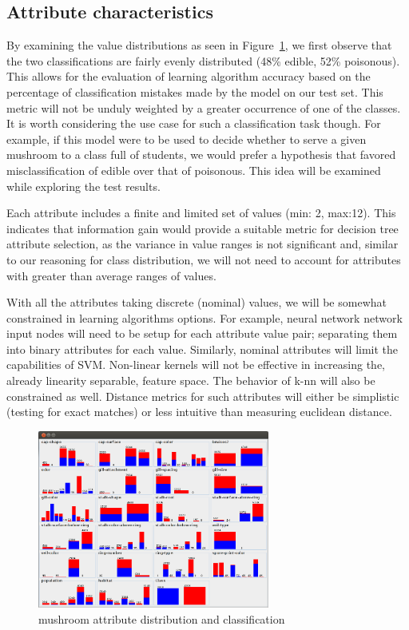 \documentclass{sig-alternate}
\begin{document}
\subsection{Attribute characteristics}

By examining the value distributions as seen in Figure~\ref{ag-data-viz}, we first observe that the two classifications are fairly evenly distributed (48\% edible, 52\% poisonous). This allows for the evaluation of learning algorithm accuracy based on the percentage of classification mistakes made by the model on our test set. This metric will not be unduly weighted by a greater occurrence of one of the classes. It is worth considering the use case for such a classification task though. For example, if this model were to be used to decide whether to serve a given mushroom to a class full of students, we would prefer a hypothesis that favored misclassification of edible over that of poisonous. This idea will be examined while exploring the test results.

Each attribute includes a finite and limited set of values (min: 2, max:12). This indicates that information gain would provide a suitable metric for decision tree attribute selection, as the variance in value ranges is not significant and, similar to our reasoning for class distribution, we will not need to account for attributes with greater than average ranges of values.

With all the attributes taking discrete (nominal) values, we will be somewhat constrained in learning algorithms options. For example, neural network network input nodes will need to be setup for each attribute value pair; separating them into binary attributes for each value. Similarly, nominal attributes will limit the capabilities of SVM. Non-linear kernels will not be effective in increasing the, already linearity separable, feature space. The behavior of k-nn will also be constrained as well. Distance metrics for such attributes will either be simplistic (testing for exact matches) or less intuitive than measuring euclidean distance.

\begin{figure}[!htbp]
    \centering
    \includegraphics[width=3in]{data/agaricus-lepiota/ag-data-viz.png}
    \caption{mushroom attribute distribution and classification \label{ag-data-viz}}
\end{figure} 
\end{document}
